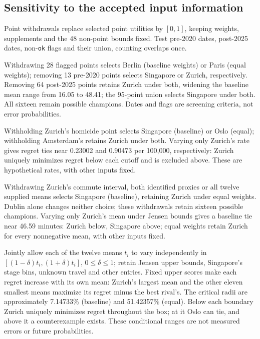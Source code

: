 \subsection{Sensitivity to the accepted input information}\label{sec:sourcepolicy}
Point withdrawals replace selected point utilities by $[0,1]$, keeping weights,
supplements and the 48 non-point bounds fixed. Test pre-2020 dates, post-2025
dates, non-\texttt{ok} flags and their union, counting overlaps once.



Withdrawing 28 flagged points selects Berlin (baseline weights) or Paris
(equal weights); removing 13 pre-2020 points selects Singapore or Zurich,
respectively. Removing 64 post-2025 points retains Zurich under both,
widening the baseline mean range from 16.05 to 48.41; the 95-point union
selects Singapore under both. All sixteen remain possible champions.
Dates and flags are screening criteria, not error probabilities.

Withholding Zurich's homicide point selects Singapore (baseline) or Oslo
(equal); withholding Amsterdam's retains Zurich under both. Varying only
Zurich's rate gives regret ties near 0.23002 and 0.90473 per 100,000,
respectively: Zurich uniquely minimizes regret below each cutoff and is
excluded above. These are hypothetical rates, with other inputs fixed.

Withdrawing Zurich's commute interval, both identified proxies or all twelve
supplied means selects Singapore (baseline), retaining Zurich under equal
weights. Dublin alone changes neither choice; these withdrawals retain sixteen
possible champions. Varying only Zurich's mean under Jensen bounds gives a baseline tie
near 46.59 minutes: Zurich below, Singapore above; equal weights retain
Zurich for every nonnegative mean, with other inputs fixed.

Jointly allow each of the twelve means $t_i$ to vary independently in
$[(1-\delta)t_i,(1+\delta)t_i]$, $0\leq\delta\leq1$; retain Jensen upper bounds,
Singapore's stage bins, unknown travel and other entries. Fixed upper scores
make each regret increase with its own mean: Zurich's largest mean and the
other eleven smallest means maximize its regret minus the best rival's.
The critical radii are approximately 7.14733\% (baseline) and 51.42357\% (equal).
Below each boundary Zurich uniquely minimizes regret throughout the box;
at it Oslo can tie, and above it a counterexample exists.
These conditional ranges are not measured errors or future probabilities.
